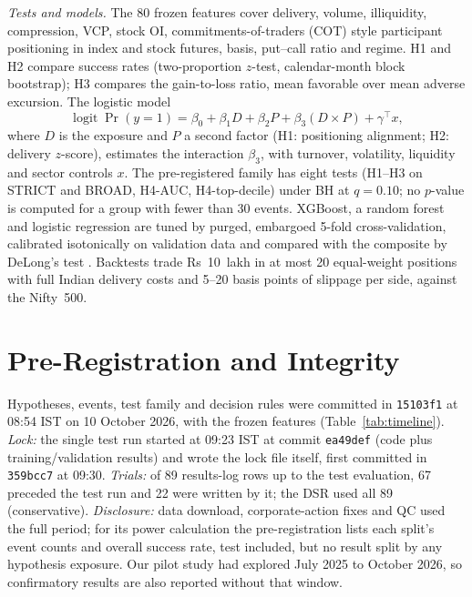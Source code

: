 \documentclass[conference]{IEEEtran}
\newcommand{\NFeatures}{80}
\newcommand{\MaxPositions}{20}
\newcommand{\DSRtrials}{89}
\newcommand{\TrialsBefore}{67}
\newcommand{\TrialsTestRun}{22}
\newcommand{\TrialsThroughPSix}{89}
\newcommand{\PreregCommit}{15103f1}
\newcommand{\PreregTime}{08:54}
\newcommand{\LockHead}{ea49def}
\newcommand{\LockStart}{09:23}
\newcommand{\LockCommit}{359bcc7}
\newcommand{\LockCommitTime}{09:30}
\begin{document}
\emph{Tests and models.} The \NFeatures{} frozen features cover delivery, volume, illiquidity, compression,
VCP, stock OI, commitments-of-traders (COT) style participant positioning in index and stock futures, basis,
put--call ratio and regime. H1 and H2 compare success rates (two-proportion $z$-test, calendar-month block
bootstrap); H3 compares the gain-to-loss ratio, mean favorable over mean adverse excursion. The logistic model
\begin{equation}
\operatorname{logit}\Pr(y=1)=\beta_0+\beta_1 D+\beta_2 P+\beta_3 (D\times P)+\gamma^{\top}x,
\label{eq:logit}
\end{equation}
where $D$ is the exposure and $P$ a second factor (H1: positioning alignment; H2: delivery $z$-score),
estimates the interaction $\beta_3$, with turnover, volatility, liquidity and sector controls $x$. The
pre-registered family has eight tests (H1--H3 on STRICT and BROAD, H4-AUC, H4-top-decile) under BH at
$q=0.10$; no $p$-value is computed for a group with fewer than 30 events. XGBoost, a random forest and logistic
regression are tuned by purged, embargoed 5-fold cross-validation, calibrated isotonically on validation data
and compared with the composite by DeLong's test \cite{delong1988}. Backtests trade Rs~10~lakh in at most
\MaxPositions{} equal-weight positions with full Indian delivery costs and 5--20 basis points of slippage per
side, against the Nifty~500.

\section{Pre-Registration and Integrity}\label{sec:prereg}
Hypotheses, events, test family and decision rules were committed in \texttt{\PreregCommit} at \PreregTime{}
IST on 10 October 2026, with the frozen features (Table~\ref{tab:timeline}). \emph{Lock:} the single test run
started at \LockStart{} IST at commit \texttt{\LockHead} (code plus training/validation results) and wrote the
lock file itself, first committed in \texttt{\LockCommit} at \LockCommitTime. \emph{Trials:} of
\TrialsThroughPSix{} results-log rows up to the test evaluation, \TrialsBefore{} preceded the test run and
\TrialsTestRun{} were written by it; the DSR used all \DSRtrials{} (conservative). \emph{Disclosure:} data
download, corporate-action fixes and QC used the full period; for its power calculation the pre-registration
lists each split's event counts and overall success rate, test included, but no result split by any
hypothesis exposure. Our pilot study had explored July 2025 to October 2026, so confirmatory results are also
reported without that window.
\end{document}
